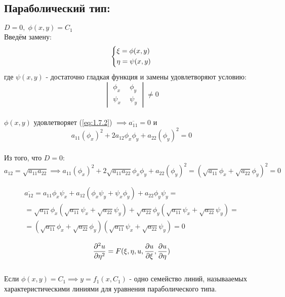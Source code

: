 \documentclass[../main.tex]{subfiles}
\begin{document}
\subsection*{Параболический тип: }
$D = 0, \; \phi(x, y) = C_1$
\\
Введём замену:
$$\begin{dcases}\xi = \phi(x,y) \\ \eta = \psi(x,y) \end{dcases}$$
где $\psi(x,y)$ - достаточно гладкая функция и замены удовлетворяют условию:
$$\begin{vmatrix}
		\phi_x \  & \ \phi_y
		\\
		\psi_x \  & \ \psi_y
	\end{vmatrix} \ne 0
$$ \\
$\phi(x,y)$ удовлетворяет (\ref{eq:1.7.2}) $\implies \overline{a_{11}}=0$ и \\
\begin{equation}
	a_{11}(\phi_x)^2 + 2a_{12}\phi_x\phi_y + a_{22}(\phi_y)^2=0
\end{equation}
\\
Из того, что $D=0$:
\begin{equation}\label{eq:1.7.4}
	a_{12}=\sqrt{a_{11}a_{22}} \implies 
	a_{11}(\phi_x)^2 + 2\sqrt{a_{11}a_{22}}\phi_x\phi_y + a_{22}(\phi_y)^2 =
	(\sqrt{a_{11}}\phi_x + \sqrt{a_{22}}\phi_y)^2=0
\end{equation}

\begin{gather*}
\overline{a_{12}}=a_{11}\phi_x\psi_x + a_{12}(\phi_x\psi_y + \psi_x\phi_y)+a_{22}\phi_y\psi_y = \\
 = \sqrt{a_{11}}\phi_x(\sqrt{a_{11}}\psi_x + \sqrt{a_{22}}\psi_y) + \sqrt{a_{22}}\phi_y(\sqrt{a_{11}}\psi_x + \sqrt{a_{22}}\psi_y)= \\
 = (\sqrt{a_{11}}\phi_x + \sqrt{a_{22}}\phi_y)(\sqrt{a_{11}}\psi_x + \sqrt{a_{22}}\psi_y) = 0
\end{gather*}

$$\frac{\partial^2u}{\partial\eta^2} = F(\xi, \eta, u, \frac{\partial u}{\partial \xi}, \frac{\partial u}{\partial \eta})$$\\
Если $\phi(x,y)=C_1 \implies y = f_1(x, C_1)$ - одно семейство линий, называаемых характеристическими линиями для уравнения параболического типа.\\
\end{document}
